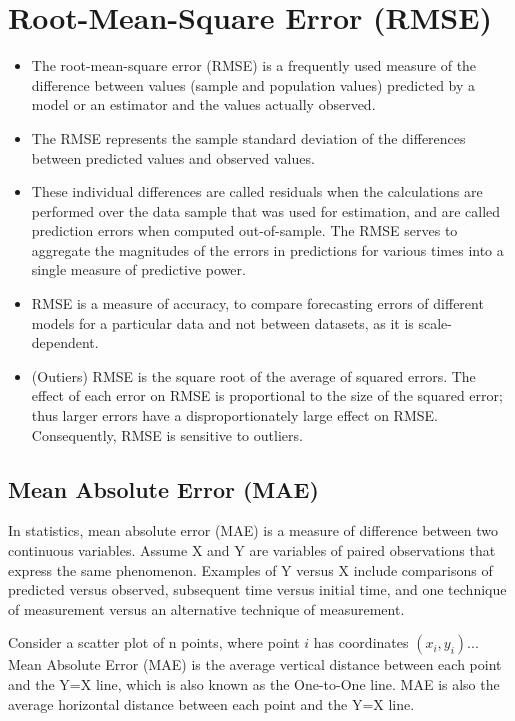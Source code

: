 \documentclass[]{report}
\begin{document}
\section*{Root-Mean-Square Error (RMSE) }
\begin{itemize}
\item The root-mean-square error (RMSE) is a frequently used measure of the difference between values (sample and population values) predicted by a model or an estimator and the values actually observed. 
\item The RMSE represents the sample standard deviation of the differences between predicted values and observed values. 

\item These individual differences are called residuals when the calculations are performed over the data sample that was used for estimation, and are called prediction errors when computed out-of-sample. The RMSE serves to aggregate the magnitudes of the errors in predictions for various times into a single measure of predictive power. 
\item RMSE is a measure of accuracy, to compare forecasting errors of different models for a particular data and not between datasets, as it is scale-dependent.
\item (Outiers)
RMSE is the square root of the average of squared errors. The effect of each error on RMSE is proportional to the size of the squared error; thus larger errors have a disproportionately large effect on RMSE. Consequently, RMSE is sensitive to outliers.
\end{itemize}
\subsection*{Mean Absolute Error (MAE)}
In statistics, mean absolute error (MAE) is a measure of difference between two continuous variables. Assume X and Y are variables of paired observations that express the same phenomenon. Examples of Y versus X include comparisons of predicted versus observed, subsequent time versus initial time, and one technique of measurement versus an alternative technique of measurement. 


Consider a scatter plot of n points, where point $i$ has coordinates $(x_i, y_i)...$ Mean Absolute Error (MAE) is the average vertical distance between each point and the Y=X line, which is also known as the One-to-One line. MAE is also the average horizontal distance between each point and the Y=X line.
\end{document}
